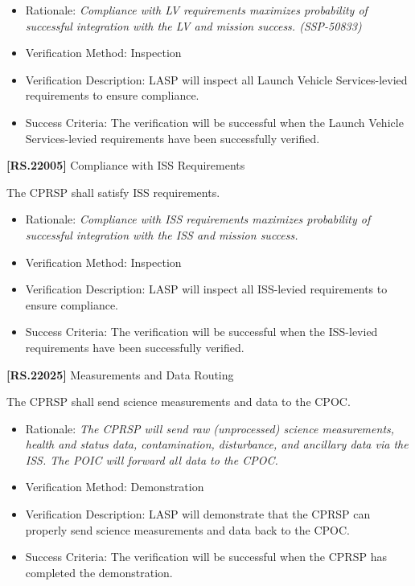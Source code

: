 \begin{itemize}
\item{} Rationale: \emph{Compliance with LV requirements maximizes probability of successful integration with the LV and mission success. (SSP-50833)}

\item{} Verification Method: Inspection

\item{} Verification Description: \gls{LASP} will inspect all Launch Vehicle Services-levied requirements to ensure compliance.

\item{} Success Criteria: The verification will be successful when the Launch Vehicle Services-levied requirements have been successfully verified.

\end{itemize}

\textbf{[RS.22005]} Compliance with \gls{ISS} Requirements

The \gls{CPRSP} shall satisfy \gls{ISS} requirements.

\begin{itemize}
\item{} Rationale: \emph{Compliance with ISS requirements maximizes probability of successful integration with the ISS and mission success.}

\item{} Verification Method: Inspection

\item{} Verification Description: \gls{LASP} will inspect all \gls{ISS}-levied requirements to ensure compliance.

\item{} Success Criteria: The verification will be successful when the \gls{ISS}-levied requirements have been successfully verified.

\end{itemize}

\textbf{[RS.22025]} Measurements and Data Routing

The \gls{CPRSP} shall send science \gls{measure}ments and data to the \gls{CPOC}.

\begin{itemize}
\item{} Rationale: \emph{The CPRSP will send raw (unprocessed) science measurements, health and status data, contamination, disturbance, and ancillary data via the ISS. The POIC will forward all data to the CPOC.}

\item{} Verification Method: Demonstration

\item{} Verification Description: \gls{LASP} will demonstrate that the \gls{CPRSP} can properly send science \gls{measure}ments and data back to the \gls{CPOC}.

\item{} Success Criteria: The verification will be successful when the \gls{CPRSP} has completed the \gls{demonstration}.

\end{itemize}

